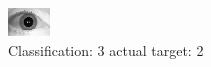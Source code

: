 \begin{figure}[h!]
\begin{center}
\includegraphics[width=0.60\columnwidth]{figures/ID1676_class_3_target_2.png}
\end{center}
\caption{ Classification: 3 actual target: 2}
\label{fig:ID1676_class_3_target_2}
\end{figure}

